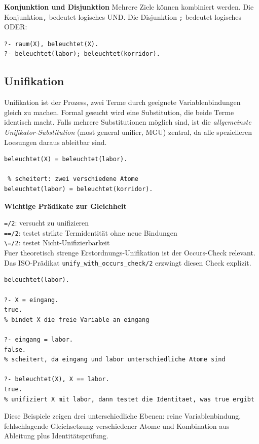 \documentclass[parskip=half,a4paper,11pt]{scrreprt}
\begin{document}
\textbf{Konjunktion und Disjunktion
}
Mehrere Ziele können kombiniert werden. Die Konjunktion\texttt{,} bedeutet logisches UND. Die Disjunktion \texttt{;} bedeutet logisches ODER:
\begin{lstlisting}
?- raum(X), beleuchtet(X).
?- beleuchtet(labor); beleuchtet(korridor).
\end{lstlisting}
\subsection{Unifikation}

Unifikation ist der Prozess, zwei Terme durch geeignete Variablenbindungen gleich zu machen. Formal gesucht wird eine Substitution, die beide Terme identisch macht. Falls mehrere Substitutionen möglich sind, ist die \textit{allgemeinste Unifikator-Substitution} (most general unifier, MGU) zentral, da alle spezielleren Loesungen daraus ableitbar sind.
\begin{lstlisting}[caption={}]
% unifiziert: X wird an labor gebunden
beleuchtet(X) = beleuchtet(labor).   

 % scheitert: zwei verschiedene Atome
beleuchtet(labor) = beleuchtet(korridor).
\end{lstlisting}
\textbf{Wichtige Prädikate zur Gleichheit}

\texttt{=/2}: versucht zu unifizieren\\
\texttt{==/2}: testet strikte Termidentität ohne neue Bindungen\\
\texttt{\textbackslash =/2}: testet Nicht-Unifizierbarkeit\\

Fuer theoretisch strenge Erstordnungs-Unifikation ist der Occurs-Check relevant. Das ISO-Prädikat \texttt{unify\_with\_occurs\_check/2} erzwingt diesen Check explizit.
\begin{lstlisting}[caption={}]
beleuchtet(labor).

?- X = eingang.
true.
% bindet X die freie Variable an eingang

?- eingang = labor.
false.
% scheitert, da eingang und labor unterschiedliche Atome sind

?- beleuchtet(X), X == labor.
true.
% unifiziert X mit labor, dann testet die Identitaet, was true ergibt
\end{lstlisting}
Diese Beispiele zeigen drei unterschiedliche Ebenen: reine Variablenbindung, fehlschlagende Gleichsetzung verschiedener Atome und Kombination aus Ableitung plus Identitätsprüfung.
\end{document}
